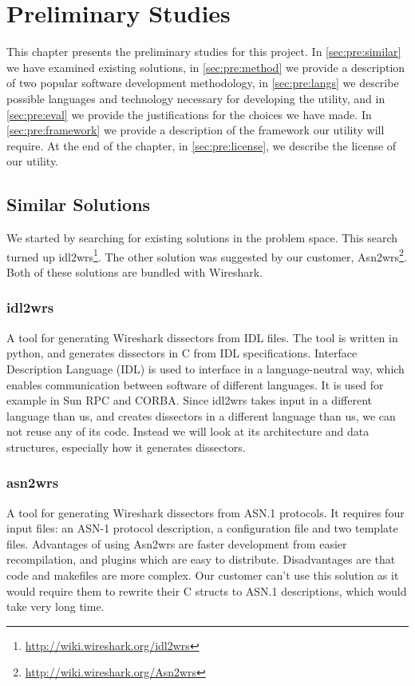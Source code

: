 \chapter{Preliminary Studies}
This chapter presents the preliminary studies for this project.
In \autoref{sec:pre:similar} we have examined existing solutions, in
\autoref{sec:pre:method} we provide a description of two popular software
development methodology, in \autoref{sec:pre:langs} we describe possible
languages and technology necessary for developing the utility, and in
\autoref{sec:pre:eval} we provide the justifications for the choices we have
made. In \autoref{sec:pre:framework} we provide a description of the framework
our utility will require. At the end of the chapter, in
\autoref{sec:pre:license}, we describe the license of our utility.

\section{Similar Solutions}
\label{sec:pre:similar}
We started by searching for existing solutions in the problem space. This
search turned up idl2wrs\footnote{\url{http://wiki.wireshark.org/idl2wrs}}.
The other solution was suggested by our customer,
Asn2wrs\footnote{\url{http://wiki.wireshark.org/Asn2wrs}}.
Both of these solutions are bundled with Wireshark.

\subsection{idl2wrs}
A tool for generating Wireshark dissectors from IDL files. The tool is written
in python, and generates dissectors in C from IDL specifications. Interface
Description Language (IDL) is used to interface in a language-neutral way,
which enables communication between software of different languages. It is
used for example in Sun RPC and CORBA. Since idl2wrs takes input in a different
language than us, and creates dissectors in a different language than us, we
can not reuse any of its code. Instead we will look at its architecture and
data structures, especially how it generates dissectors.

\subsection{asn2wrs}
A tool for generating Wireshark dissectors from ASN.1 protocols. It requires
four input files: an ASN-1 protocol description, a configuration file and two
template files. Advantages of using Asn2wrs are faster development from
easier recompilation, and plugins which are easy to distribute. Disadvantages
are that code and makefiles are more complex. Our customer can't use this
solution as it would require them to rewrite their C structs to ASN.1
descriptions, which would take very long time.


